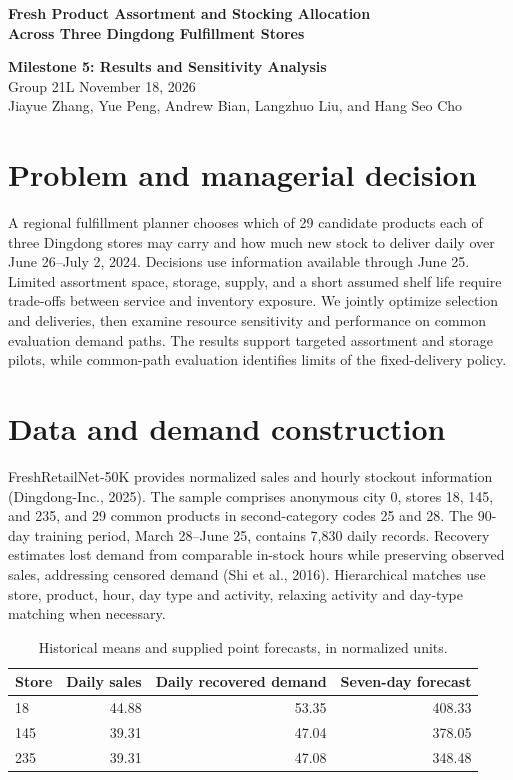 \documentclass[11pt,letterpaper]{article}
\begin{document}
{\large\bfseries Fresh Product Assortment and Stocking Allocation\\
Across Three Dingdong Fulfillment Stores\par}
\textbf{Milestone 5: Results and Sensitivity Analysis}\\
Group 21L \hfill November 18, 2026\\
Jiayue Zhang, Yue Peng, Andrew Bian, Langzhuo Liu, and Hang Seo Cho

\section{Problem and managerial decision}
A regional fulfillment planner chooses which of 29 candidate products
each of three Dingdong stores may carry and how much new stock to
deliver daily over June 26--July 2, 2024. Decisions use information
available through June 25. Limited assortment space, storage, supply,
and a short assumed shelf life require trade-offs between service and
inventory exposure. We jointly optimize selection and deliveries,
then examine resource sensitivity and performance on common evaluation
demand paths. The results support targeted assortment and storage pilots, while common-path evaluation identifies limits of the fixed-delivery policy.

\section{Data and demand construction}\label{sec:data}
FreshRetailNet-50K provides normalized sales and hourly stockout information
(Dingdong-Inc., 2025). The sample comprises anonymous city 0, stores 18,
145, and 235, and 29 common products in second-category codes 25 and 28.
The 90-day training period, March 28--June 25, contains 7,830 daily records.
Recovery estimates lost demand from comparable in-stock hours while
preserving observed sales, addressing censored demand
(Shi et al., 2016). Hierarchical matches use store, product, hour,
day type and activity, relaxing activity and day-type matching when necessary.

\begin{table}[H]\centering
\caption{Historical means and supplied point forecasts, in normalized units.}
\begin{tabular}{lrrr}\toprule
Store & Daily sales & Daily recovered demand & Seven-day forecast\\\midrule
18 & 44.88 & 53.35 & 408.33\\
145 & 39.31 & 47.04 & 378.05\\
235 & 39.31 & 47.08 & 348.48\\\bottomrule
\end{tabular}\end{table}
\end{document}
